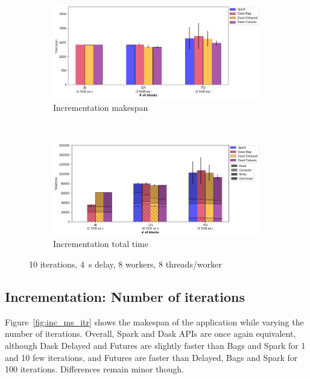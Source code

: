 \documentclass[conference]{IEEEtran}
\begin{document}
\begin{figure}[!t]
    \centering
    \begin{subfigure}[b]{\columnwidth}
        \includegraphics[clip,width=\columnwidth]{images/inc_block.png}%
        \caption{Incrementation makespan}\label{fig:inc_ms_block}
    \end{subfigure}
    \\
    \begin{subfigure}[b]{\columnwidth}
        \includegraphics[clip,width=\columnwidth]{images/inc_idle_block.png}%
        \caption{Incrementation total time}\label{fig:inc_tt_block}
    \end{subfigure}
    \caption{10 iterations, \SI{4}{\second} delay, 8 workers, 8
    threads/worker}\label{fig:inc_block}
\end{figure}

\subsection{Incrementation: Number of iterations}
Figure~\ref{fig:inc_ms_itr} shows the makespan of the application while
varying the number of iterations. Overall,  Spark and Dask APIs are once
again equivalent, although Dask Delayed and Futures are slightly faster
than Bags and Spark for 1 and 10 few iterations, and Futures are faster than
Delayed, Bags and Spark for 100 iterations. Differences remain minor
though.
\end{document}

